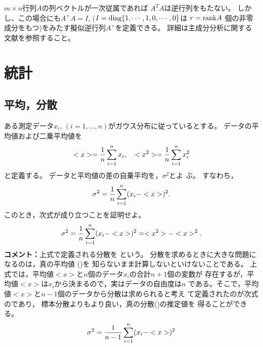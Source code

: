 \documentclass[twocolumn,11pt]{jarticle}
\begin{document}
\comment
$m\times n$行列$A$の列ベクトルが一次従属であれば 
$A^TA$は逆行列をもたない。
しかし、この場合にも$A^+A=I$, ($I=\mbox{diag}\{1,\cdots,1,0,\cdots,0\}$は
$r=\mbox{rank} A$
個の非零成分をもつ)をみたす擬似逆行列$A^+$を定義できる。
詳細は主成分分析に関する文献を参照すること。

\section{統計}

\subsection{平均，分散}
ある測定データ$x_i$, $(i=1,...,n)$がガウス分布に従っているとする。
データの平均値および二乗平均値を
\begin{align}
<x>=\frac{1}{n}\sum_{i=1}^nx_i,\quad
<x^2>=\frac{1}{n}\sum_{i=1}^nx_i^2\notag
\end{align}
と定義する。
データと平均値の差の自乗平均を，$\sigma^2$とよ
ぶ。
すなわち，
\begin{align}
\sigma^2=\frac{1}{n}\sum_{i=1}^n(x_i-<x>)^2.\notag
\end{align}
このとき，次式が成り立つことを証明せよ。
\begin{align}
\sigma^2=\frac{1}{n}\sum_{i=1}^n(x_i-<x>)^2=<x^2>-<x>^2.\notag
\end{align}
\textbf{コメント：}上式で定義される分散を
という。 
分散を求めるときに大きな問題になるのは，真の平均値
()を
知らないまま計算しないといけないことである。
上式では，平均値$<x>$と$n$個のデータ$x_i$の合計$n+1$個の変数が
存在するが，平均値$<x>$は$x_i$から決まるので，実はデータの自由度は$n$
である。そこで，平均値$<x>$と$n-1$個のデータから分散は求められると考え
て定義されたのが次式のであり，
標本分散よりもより良い，真の分散()の推定値を
得ることができる。
\begin{align}
\sigma^2=\frac{1}{n-1}\sum_{i=1}^n(x_i-<x>)^2\notag
\end{align}
% 
\end{document}
